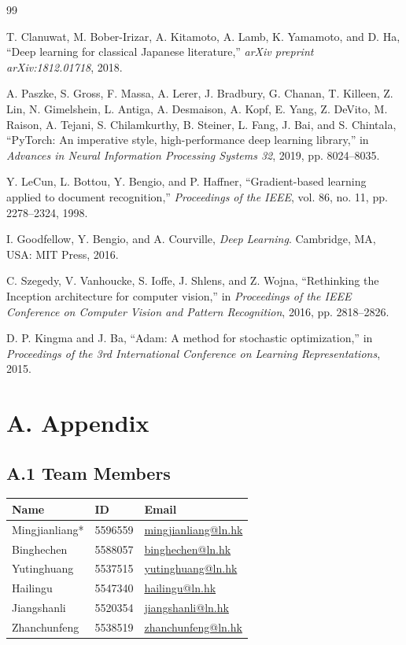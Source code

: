 \documentclass[conference]{IEEEtran}
\begin{document}
\begin{thebibliography}{99}

T. Clanuwat, M. Bober-Irizar, A. Kitamoto, A. Lamb, K. Yamamoto, and D. Ha,
``Deep learning for classical Japanese literature,''
\emph{arXiv preprint arXiv:1812.01718}, 2018.

A. Paszke, S. Gross, F. Massa, A. Lerer, J. Bradbury, G. Chanan, T. Killeen,
Z. Lin, N. Gimelshein, L. Antiga, A. Desmaison, A. Kopf, E. Yang,
Z. DeVito, M. Raison, A. Tejani, S. Chilamkurthy, B. Steiner, L. Fang,
J. Bai, and S. Chintala,
``PyTorch: An imperative style, high-performance deep learning library,''
in \emph{Advances in Neural Information Processing Systems 32}, 2019,
pp. 8024--8035.

Y. LeCun, L. Bottou, Y. Bengio, and P. Haffner,
``Gradient-based learning applied to document recognition,''
\emph{Proceedings of the IEEE}, vol. 86, no. 11, pp. 2278--2324, 1998.

I. Goodfellow, Y. Bengio, and A. Courville,
\emph{Deep Learning}.
Cambridge, MA, USA: MIT Press, 2016.

C. Szegedy, V. Vanhoucke, S. Ioffe, J. Shlens, and Z. Wojna,
``Rethinking the Inception architecture for computer vision,''
in \emph{Proceedings of the IEEE Conference on Computer Vision and Pattern Recognition}, 2016,
pp. 2818--2826.

D. P. Kingma and J. Ba,
``Adam: A method for stochastic optimization,''
in \emph{Proceedings of the 3rd International Conference on Learning Representations}, 2015.

\end{thebibliography}

\clearpage
\section*{A. Appendix}

\subsection*{A.1 Team Members}

\begin{center}
\renewcommand{\arraystretch}{1.15}
\footnotesize
\begin{tabular}{@{}p{1.05in}p{0.55in}p{1.30in}@{}}
\toprule
Name & ID & Email \\
\midrule
Mingjianliang* & 5596559 & \url{mingjianliang@ln.hk} \\
Binghechen & 5588057 & \url{binghechen@ln.hk} \\
Yutinghuang & 5537515 & \url{yutinghuang@ln.hk} \\
Hailingu & 5547340 & \url{hailingu@ln.hk} \\
Jiangshanli & 5520354 & \url{jiangshanli@ln.hk} \\
Zhanchunfeng & 5538519 & \url{zhanchunfeng@ln.hk} \\
\bottomrule
\end{tabular}
\end{center}
\end{document}
